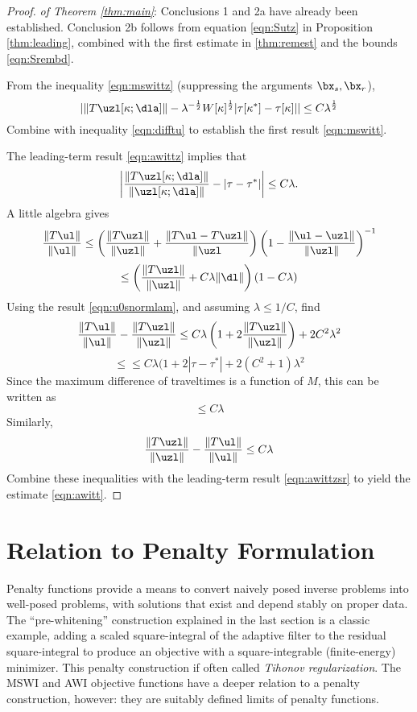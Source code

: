\begin{proof} {\em of Theorem \ref{thm:main}}:
Conclusions 1 and 2a have already been established. Conclusion 2b
follows from equation \ref{eqn:Sutz} in Proposition \ref{thm:leading},
combined with the first estimate in \ref{thm:remest} and the bounds
\ref{eqn:Srembd}.

  From the inequality \ref{eqn:mswittz}
  (suppressing the arguments $\bx_s,\bx_r$),
  \[
   | \|T\uzl[\kappa;\dla] \|- 
   \lambda^{-\frac{1}{2}}
   W[\kappa]^{\frac{1}{2}}|\tau[\kappa^*]-\tau[\kappa]| | \le
   C\lambda^{\frac{1}{2}}
 \]
 Combine with inequality \ref{eqn:difftu} to establish the first
 result \ref{eqn:mswitt}.

 The leading-term result \ref{eqn:awittz} implies that
 \begin{equation}
   \label{eqn:awittzsr}
   \left| \frac{\|T\uzl[\kappa;\dla] \|}{
       \|\uzl[\kappa;\dla] \|} - |\tau-\tau^*|\right|  \le C\lambda.
 \end{equation}
 A little algebra gives
 \[
   \frac{\|T\ul\|}{\|\ul\|} \le \left(\frac{\|T\uzl\|}{\|\uzl\|}+\frac{\|T\ul
     -T\uzl\|}{\|\uzl}\right)\left(1-\frac{\|\ul-\uzl\|}{\|\uzl\|}\right)^{-1}
 \]
 \[
   \le \left(\frac{\|T\uzl\|}{\|\uzl\|} + C\lambda \|\dl\|\right) (1-C\lambda)
 \]
 Using the result \ref{eqn:u0snormlam}, and assuming $\lambda \le
 1/C$, find
 \[
 \frac{\|T\ul\|}{\|\ul\|}-\frac{\|T\uzl\|}{\|\uzl\|} \le C\lambda
 \left(1+2 \frac{\|T\uzl\|}{\|\uzl\|} \right) + 2 C^2 \lambda^2
\]
\[
  \le \le C\lambda  (1+2|\tau - \tau^*| + 2 (C^2+1) \lambda^2
\]
Since the maximum difference of traveltimes is a function of $M$, this
can be written as
\[
  \le C\lambda
\]
Similarly,
\[
  \frac{\|T\uzl\|}{\|\uzl\|}-\frac{\|T\ul\|}{\|\ul\|} \le C\lambda
\]
Combine these inequalities with the leading-term result
\ref{eqn:awittzsr} to yield the estimate \ref{eqn:awitt}.

\end{proof}


\section{Relation to Penalty Formulation}
Penalty functions provide a means to convert naively posed
inverse problems into well-posed problems, with solutions that exist
and depend stably on proper data. The ``pre-whitening'' construction
explained in the last section is a classic example, adding a scaled
square-integral of the adaptive filter to the residual square-integral to
produce an objective with a square-integrable (finite-energy)
minimizer. This penalty construction if often called {\em Tihonov
  regularization}. The MSWI and AWI objective functions have a deeper
relation to a penalty construction, however: they are
suitably defined limits of penalty functions.

